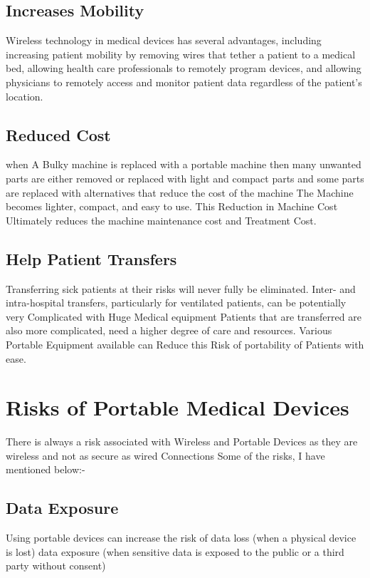 \documentclass[12pt]{article}
\begin{document}
\subsection{Increases Mobility}
Wireless technology in medical devices has several advantages, including increasing patient mobility by removing wires that tether a patient to a medical bed, allowing health care professionals to remotely program devices, and allowing physicians to remotely access and monitor patient data regardless of the patient's location. \cite{FDA:2018}

 \subsection{Reduced Cost}
when A Bulky machine is replaced with a portable machine then many unwanted parts are either removed or replaced with light and compact parts and some parts are replaced with alternatives that reduce the cost of the machine The Machine becomes lighter, compact, and easy to use. This Reduction in Machine Cost Ultimately reduces the machine maintenance cost and Treatment Cost.
 
 \subsection{Help Patient Transfers} 
 Transferring sick patients at their risks will never fully be eliminated. Inter- and intra-hospital transfers, particularly for ventilated patients, can be potentially very Complicated with Huge Medical equipment Patients that are transferred are also more complicated, need a higher degree of care and resources. Various Portable Equipment available can Reduce this Risk of portability of Patients with ease. \cite{Today:2021}
 
\section{Risks of Portable Medical Devices}
There is always a risk associated with Wireless and Portable Devices as they are wireless and not as secure as wired Connections Some of the risks, I have mentioned below:-
\subsection{Data Exposure}
Using portable devices can increase the risk of data loss (when a physical device is lost) data exposure (when sensitive data is exposed to the public or a third party without consent)
\end{document}
